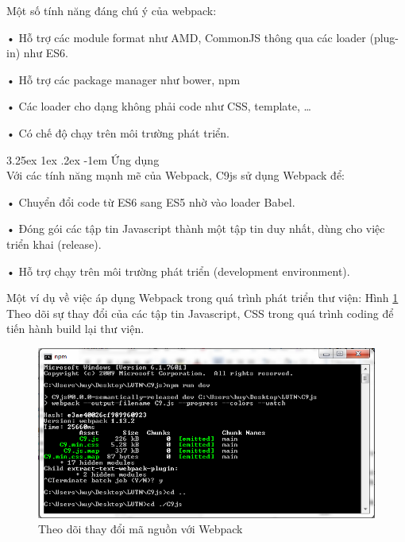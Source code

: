 \documentclass[12pt,a4paper]{article}
\makeatletter
\newcommand{\myparagraph}[1]{\paragraph{#1}\mbox{}\\} %
\renewcommand\paragraph{\@startsection{paragraph}{5}{\z@}%
  {3.25ex \@plus1ex \@minus.2ex}%
  {-1em}%
  {\normalfont\normalsize\bfseries}}
\makeatother
\begin{document}
Một số tính năng đáng chú ý của webpack:

\begin{list}{}{}
\item[•] Hỗ trợ các module format như AMD, CommonJS thông qua các loader (plug-in) như ES6.
\item[•] Hỗ trợ các package manager như bower, npm
\item[•] Các loader cho dạng không phải code như CSS, template, …
\item[•] Có chế độ chạy trên môi trường phát triển.
\end{list}

\myparagraph{Ứng dụng}
Với các tính năng mạnh mẽ của Webpack, C9js sử dụng Webpack để:

\begin{list}{}{}
\item[•] Chuyển đổi code từ ES6 sang ES5 nhờ vào loader Babel.
\item[•] Đóng gói các tập tin Javascript thành một tập tin duy nhất, dùng cho việc triển khai (release).
\item[•] Hỗ trợ chạy trên môi trường phát triển (development environment).
\end{list}

Một ví dụ về việc áp dụng Webpack trong quá trình phát triển thư viện: Hình \ref{fig:webpack_build} Theo dõi sự thay đổi của các tập tin Javascript, CSS trong quá trình coding để tiến hành build lại thư viện.

\begin{figure}[htp]
	\begin{center}
    \includegraphics[scale=.8]{image/webpack_build}
    \caption{Theo dõi thay đổi mã nguồn với Webpack}
    \label{fig:webpack_build}
	\end{center}
\end{figure}
\end{document}
